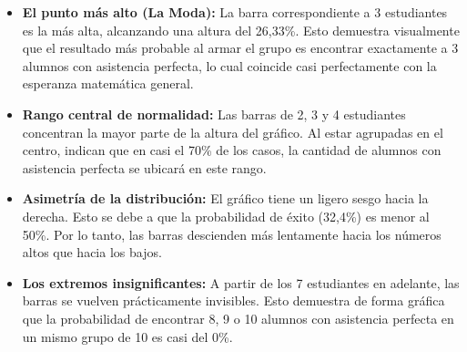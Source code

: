 \begin{itemize}
  \item \textbf{El punto más alto (La Moda):}
    La barra correspondiente a 3 estudiantes es la más alta, alcanzando una altura del 26,33\%. Esto
    demuestra visualmente que el resultado más probable al armar el grupo es encontrar exactamente a
    3 alumnos con asistencia perfecta, lo cual coincide casi perfectamente con la esperanza
    matemática general.

  \item \textbf{Rango central de normalidad:}
    Las barras de 2, 3 y 4 estudiantes concentran la mayor parte de la altura del gráfico. Al estar
    agrupadas en el centro, indican que en casi el 70\% de los casos, la cantidad de alumnos con
    asistencia perfecta se ubicará en este rango.

  \item \textbf{Asimetría de la distribución:}
    El gráfico tiene un ligero sesgo hacia la derecha. Esto se debe a que la probabilidad de éxito
    (32,4\%) es menor al 50\%. Por lo tanto, las barras descienden más lentamente hacia los números
    altos que hacia los bajos.

  \item \textbf{Los extremos insignificantes:}
    A partir de los 7 estudiantes en adelante, las barras se vuelven prácticamente invisibles. Esto
    demuestra de forma gráfica que la probabilidad de encontrar 8, 9 o 10 alumnos con asistencia
    perfecta en un mismo grupo de 10 es casi del 0\%.
\end{itemize}